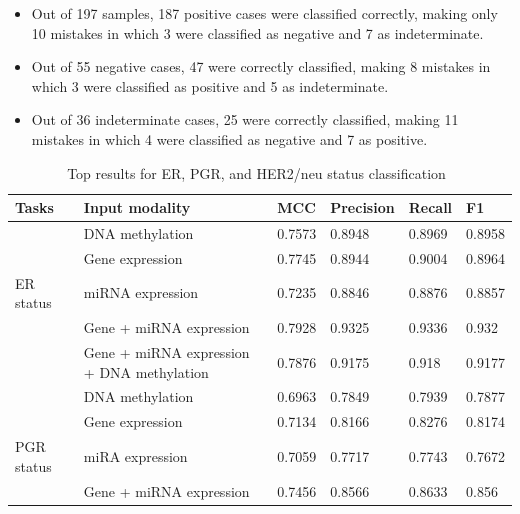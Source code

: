 \begin{itemize}[noitemsep]
    \item Out of 197 samples, 187 positive cases were classified correctly, making only 10 mistakes in which 3 were classified as negative and 7 as indeterminate. 

    \item Out of 55 negative cases, 47 were correctly classified, making 8 mistakes in which 3 were classified as positive and 5 as indeterminate. 

    \item Out of 36 indeterminate cases, 25 were correctly classified, making 11 mistakes in which 4 were classified as negative and 7 as positive.  
\end{itemize}

\begin{table}[h]
    \centering
    \footnotesize
    \caption{Top results for ER, PGR, and HER2/neu status classification~\cite{karimACCESS2019}}
    \vspace{-2mm}
    \label{tab:all_results}
    \begin{tabular}{l|l|l|l|l|l} 
        \hline
        \textbf{Tasks} & \textbf{Input modality} & \textbf{MCC} & \textbf{Precision} & \textbf{Recall} & \textbf{F1} \\ 
        \hline
         & DNA methylation   & 0.7573 & 0.8948    & 0.8969 & 0.8958  \\ 
        \cline{2-6}
            & Gene expression  & 0.7745 & 0.8944    & 0.9004 & 0.8964  \\ 
        \cline{2-6}
        ER status       & miRNA expression & 0.7235 & 0.8846    & 0.8876 & 0.8857  \\ 
        \cline{2-6}
                      & Gene + miRNA expression  & 0.7928 & 0.9325    & 0.9336 & 0.932   \\ 
        \cline{2-6}
                   & Gene + miRNA expression + DNA methylation & 0.7876 & 0.9175    & 0.918  & 0.9177  \\ 
        \hline
                     & DNA methylation   & 0.6963 & 0.7849    & 0.7939 & 0.7877  \\ 
        \cline{2-6}
                       & Gene expression  & 0.7134 & 0.8166    & 0.8276 & 0.8174  \\ 
        \cline{2-6}
        PGR status  & miRA expression   & 0.7059 & 0.7717    & 0.7743 & 0.7672  \\ 
        \cline{2-6}
                     & Gene + miRNA expression   & 0.7456 & 0.8566    & 0.8633 & 0.856   \\ 

\end{tabular}
\end{table}
